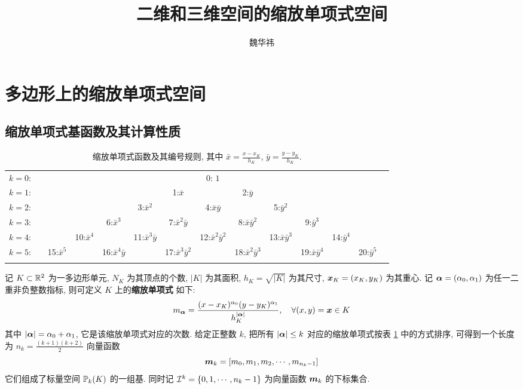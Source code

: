 \documentclass{article}
\begin{document}
\title{二维和三维空间的缩放单项式空间}
\author{魏华祎}
\date{\chntoday}
\maketitle

\section{多边形上的缩放单项式空间}

\subsection{缩放单项式基函数及其计算性质}

\begin{table}[H]
\begin{tabular}{rccccccccccccc}
    $k=0$:&    &    &    &    &    &    & 0: $1$\\\noalign{\smallskip\smallskip}
    $k=1$:&    &    &    &    &    &  1:$\bar x$ &    &  2:$\bar y$\\\noalign{\smallskip\smallskip}
    $k=2$:&    &    &    &    &  3:${\bar x}^2$ &    &  4:$\bar x\bar y$ &    & 5:${\bar y}^2$\\\noalign{\smallskip\smallskip}
    $k=3$:&    &    &    &  6:${\bar x}^3$ &    &  7:${\bar x}^2\bar y$ &    & 8:$\bar x{\bar y}^2$ &    &  9:${\bar y}^3$\\\noalign{\smallskip\smallskip}
    $k=4$:&    &    &  10:${\bar x}^4$ &    &  11:${\bar x}^3\bar y$ &    & 12:${\bar x}^2{\bar y}^2$ &    &  13:${\bar x}{\bar y}^3$ &    & 14:${\bar y}^4$ \\\noalign{\smallskip\smallskip}
    $k=5$:&    &  15:${\bar x}^5$ &    &  16:${\bar x}^4\bar y$ &    & 17:${\bar x}^3{\bar y}^2$ &    & 18:${\bar x}^2{\bar y}^3$ &    & 19:${\bar x}{\bar y}^4$ &    &  20:${\bar y}^5$
    \\\noalign{\smallskip\smallskip}
\end{tabular}
    \caption{缩放单项式函数及其编号规则, 其中 $\bar x = \frac{x - x_K}{h_K}$,
    $\bar y = \frac{ y - y_K}{h_K}$.}\label{tb:scalep}
\end{table}


记 $K\subset{\mathbb R}^2$ 为一多边形单元,  $N_K$ 为其顶点的个数, $|K|$ 为其面积, $h_K
= \sqrt{|K|}$ 为其尺寸, ${\boldsymbol x}_K =(x_K, y_K)$ 为其重心. 记 ${\bm \alpha} = (\alpha_0,
\alpha_1)$ 为任一二重非负整数指标, 则可定义 $K$ 上的{\bf 缩放单项式} 如下:
\begin{equation}
    m_{\bm \alpha} = 
    \frac{(x - x_K)^{\alpha_0}(y - y_K)^{\alpha_1}}{h_K^{|{\bm \alpha}|}},\quad
    \forall (x, y) = {\boldsymbol x} \in K
    \label{eq:sp}
\end{equation}
其中 $|{\bm \alpha}| = \alpha_0 + \alpha_1$, 它是该缩放单项式对应的次数. 给定正整数
$k$, 把所有 $|{\bm \alpha}|\leq k$ 对应的缩放单项式按表 \ref{tb:scalep} 中的方式排序, 
可得到一个长度为 $n_k = \frac{(k+1)(k+2)}{2}$ 向量函数
\begin{equation*}
    {\boldsymbol m}_k = [m_0, m_1, m_2, \cdots, m_{n_k-1}]
\end{equation*}
它们组成了标量空间 ${\mathbb P}_k(K)$ 的一组基. 同时记 ${\mathcal I}^k = \{0, 1, \cdots,
n_k-1\}$ 为向量函数 ${\boldsymbol m}_k$ 的下标集合.
\end{document}
